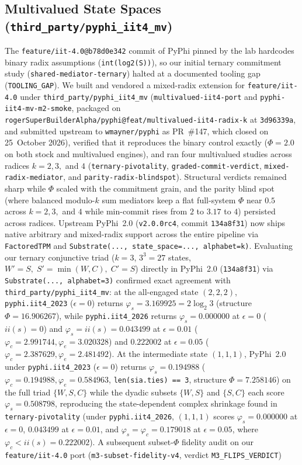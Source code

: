 \documentclass[11pt,a4paper]{article}
\begin{document}
\subsection{Multivalued State Spaces (\texttt{third\_party/pyphi\_iit4\_mv})}

The \texttt{feature/iit-4.0@b78d0e342} commit of PyPhi pinned by the lab hardcodes binary radix assumptions (\texttt{int(log2(S))}), so our initial ternary commitment study (\texttt{shared-mediator-ternary}) halted at a documented tooling gap (\texttt{TOOLING\_GAP}). We built and vendored a mixed-radix extension for \texttt{feature/iit-4.0} under \texttt{third\_party/pyphi\_iit4\_mv} (\texttt{multivalued-iit4-port} and \texttt{pyphi-iit4-mv-m2-smoke}, packaged on \texttt{rogerSuperBuilderAlpha/pyphi@feat/multivalued-iit4-radix-k} at \texttt{3d96339a}, and submitted upstream to \texttt{wmayner/pyphi} as PR~\#147, which closed on 25~October 2026), verified that it reproduces the binary control exactly ($\Phi = 2.0$ on both stock and multivalued engines), and ran four multivalued studies across radices $k = 2, 3,$ and $4$ (\texttt{ternary-pivotality}, \texttt{graded-commit-verdict}, \texttt{mixed-radix-mediator}, and \texttt{parity-radix-blindspot}). Structural verdicts remained sharp while $\Phi$ scaled with the commitment grain, and the parity blind spot (where balanced modulo-$k$ sum mediators keep a flat full-system $\Phi$ near $0.5$ across $k = 2, 3,$ and $4$ while min-commit rises from $2$ to $3.17$ to $4$) persisted across radices. Upstream PyPhi~2.0 (\texttt{v2.0.0rc4}, commit \texttt{134a8f31}) now ships native arbitrary and mixed-radix support across the entire pipeline via \texttt{FactoredTPM} and \texttt{Substrate(..., state\_space=..., alphabet=k)}. Evaluating our ternary conjunctive triad ($k = 3$, $3^3 = 27$ states, $W' = S,\; S' = \min(W, C),\; C' = S$) directly in PyPhi~2.0 (\texttt{134a8f31}) via \texttt{Substrate(..., alphabet=3)} confirmed exact agreement with \texttt{third\_party/pyphi\_iit4\_mv}: at the all-engaged state $(2, 2, 2)$, \texttt{pyphi.iit4\_2023} ($\epsilon = 0$) returns $\varphi_s = 3.169925 = 2\log_2 3$ (structure $\Phi = 16.906267$), while \texttt{pyphi.iit4\_2026} returns $\varphi_s = 0.000000$ at $\epsilon = 0$ ($\mathit{ii}(s) = 0$) and $\varphi_s = \mathit{ii}(s) = 0.043499$ at $\epsilon = 0.01$ ($\varphi_c = 2.991744, \varphi_e = 3.020328$) and $0.222002$ at $\epsilon = 0.05$ ($\varphi_c = 2.387629, \varphi_e = 2.481492$). At the intermediate state $(1, 1, 1)$, PyPhi~2.0 under \texttt{pyphi.iit4\_2023} ($\epsilon = 0$) returns $\varphi_s = 0.194988$ ($\varphi_c = 0.194988, \varphi_e = 0.584963$, \texttt{len(sia.ties) == 3}, structure $\Phi = 7.258146$) on the full triad $\{W, S, C\}$ while the dyadic subsets $\{W, S\}$ and $\{S, C\}$ each score $\varphi_s = 0.508798$, reproducing the state-dependent complex shrinkage found in \texttt{ternary-pivotality} (under \texttt{pyphi.iit4\_2026}, $(1, 1, 1)$ scores $\varphi_s = 0.000000$ at $\epsilon = 0$, $0.043499$ at $\epsilon = 0.01$, and $\varphi_s = \varphi_c = 0.179018$ at $\epsilon = 0.05$, where $\varphi_c < \mathit{ii}(s) = 0.222002$). A subsequent subset-$\Phi$ fidelity audit on our \texttt{feature/iit-4.0} port (\texttt{m3-subset-fidelity-v4}, verdict \texttt{M3\_FLIPS\_VERDICT}) 
\end{document}
